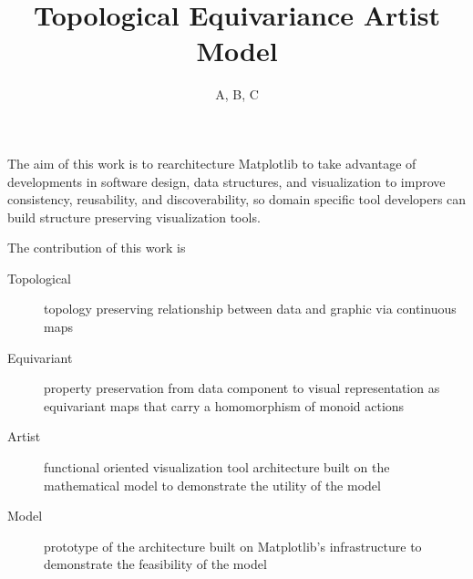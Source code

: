 \documentclass[journal]{vgtc}                %
\title{Topological Equivariance Artist Model}
\author{A, B, C}
\begin{document}

\maketitle
The aim of this work is to rearchitecture Matplotlib to take advantage of developments in software design, data structures, and visualization to improve consistency, reusability, and discoverability, so domain specific tool developers can build structure preserving visualization tools.

The contribution of this work is
\begin{description}
  \item[Topological] topology preserving relationship between data and graphic via continuous maps
  \item[Equivariant] property preservation from data component to visual representation as equivariant maps that carry a homomorphism of monoid actions
  \item[Artist] functional oriented visualization tool architecture built on the mathematical model to demonstrate the utility of the model
  \item [Model] prototype of the architecture built on Matplotlib's infrastructure to demonstrate the feasibility of the model
\end{description}
\end{document}
